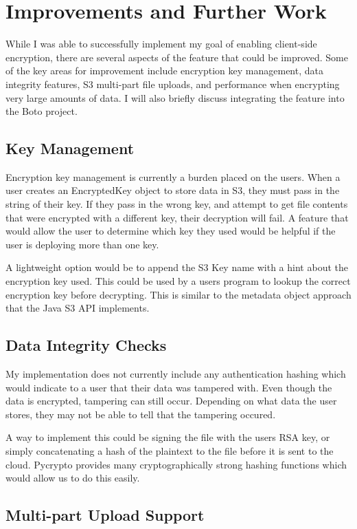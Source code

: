 \section{Improvements and Further Work}

While I was able to successfully implement my goal of enabling client-side encryption, there are several aspects
of the feature that could be improved. Some of the key areas for improvement include encryption key management,
data integrity features, S3 multi-part file uploads, and performance when encrypting very large amounts of data.
I will also briefly discuss integrating the feature into the Boto project.

\subsection{Key Management}
Encryption key management is currently a burden placed on the users. When a user creates an EncryptedKey object to store data in S3, they must pass in the string of their key. If they pass in the wrong key, and attempt to get file contents that were encrypted with a different key, their decryption will fail. A feature that would allow the user to determine which key they used would be helpful if the user is deploying more than one key.

A lightweight option would be to append the S3 Key name with a hint about the encryption key used. This could be used 
by a users program to lookup the correct encryption key before decrypting. This is similar to the metadata object approach
that the Java S3 API implements.

\subsection{Data Integrity Checks}
My implementation does not currently include any authentication hashing which would indicate to a user that their data was tampered with.
Even though the data is encrypted, tampering can still occur. Depending on what data the user stores, they may not be able to tell that
the tampering occured.

A way to implement this could be signing the file with the users RSA key, or simply concatenating a hash of the plaintext to the file before it is sent to the cloud. Pycrypto provides many cryptographically strong hashing functions which would allow us to do this easily.

\subsection{Multi-part Upload Support}

